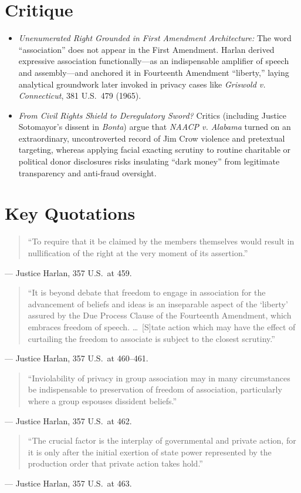 \documentclass[12pt]{article}
\begin{document}
\section{Critique}
\begin{itemize}
  \item \textit{Unenumerated Right Grounded in First Amendment Architecture:} The word ``association'' does not appear in the First Amendment. Harlan derived expressive association functionally---as an indispensable amplifier of speech and assembly---and anchored it in Fourteenth Amendment ``liberty,'' laying analytical groundwork later invoked in privacy cases like \textit{Griswold v. Connecticut}, 381 U.S.\ 479 (1965).
  \item \textit{From Civil Rights Shield to Deregulatory Sword?} Critics (including Justice Sotomayor's dissent in \textit{Bonta}) argue that \textit{NAACP v. Alabama} turned on an extraordinary, uncontroverted record of Jim Crow violence and pretextual targeting, whereas applying facial exacting scrutiny to routine charitable or political donor disclosures risks insulating ``dark money'' from legitimate transparency and anti-fraud oversight.
\end{itemize}

\section{Key Quotations}
\begin{quote}
``To require that it be claimed by the members themselves would result in nullification of the right at the very moment of its assertion.''
\end{quote}
\noindent --- Justice Harlan, 357 U.S.\ at 459.

\begin{quote}
``It is beyond debate that freedom to engage in association for the advancement of beliefs and ideas is an inseparable aspect of the `liberty' assured by the Due Process Clause of the Fourteenth Amendment, which embraces freedom of speech. \dots\ [S]tate action which may have the effect of curtailing the freedom to associate is subject to the closest scrutiny.''
\end{quote}
\noindent --- Justice Harlan, 357 U.S.\ at 460--461.

\begin{quote}
``Inviolability of privacy in group association may in many circumstances be indispensable to preservation of freedom of association, particularly where a group espouses dissident beliefs.''
\end{quote}
\noindent --- Justice Harlan, 357 U.S.\ at 462.

\begin{quote}
``The crucial factor is the interplay of governmental and private action, for it is only after the initial exertion of state power represented by the production order that private action takes hold.''
\end{quote}
\noindent --- Justice Harlan, 357 U.S.\ at 463.
\end{document}
